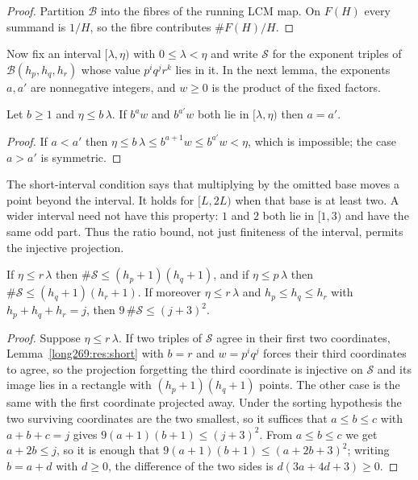 \documentclass[11pt]{article}
\theoremstyle{remark}
\theoremstyle{plain}
\newcommand{\lo}{\lambda}
\newcommand{\hi}{\eta}
\begin{document}
\begin{proof}
Partition $\mathcal B$ into the fibres of the running LCM map.  On $F(H)$ every
summand is $1/H$, so the fibre contributes $\#F(H)/H$.
\end{proof}


Now fix an interval $[\lo,\hi)$ with $0\le\lo<\hi$ and write
$\mathcal S$ for the exponent triples of $\mathcal B(h_p,h_q,h_r)$ whose
value $p^iq^jr^k$ lies in it.  In the next lemma, the exponents $a,a'$ are
nonnegative integers, and $w\ge0$ is the product of the fixed factors.

\begin{lemma}\label{long269:res:short}
Let $b\ge1$ and $\hi\le b\,\lo$.  If $b^{a}w$ and $b^{a'}w$ both lie in
$[\lo,\hi)$ then $a=a'$.
\end{lemma}

\begin{proof}
If $a<a'$ then $\hi\le b\,\lo\le b^{a+1}w\le b^{a'}w<\hi$, which is impossible;
the case $a>a'$ is symmetric.
\end{proof}

The short-interval condition says that multiplying by the omitted base
moves a point beyond the interval.  It holds for $[L,2L)$ when that base
is at least two.  A wider interval need not have this property: $1$ and
$2$ both lie in $[1,3)$ and have the same odd part.  Thus the ratio bound,
not just finiteness of the interval, permits the injective projection.

\begin{proposition}\label{long269:res:drop}
\label{long269:res:shell}
If $\hi\le r\,\lo$ then $\#\mathcal S\le(h_p+1)(h_q+1)$, and if
$\hi\le p\,\lo$ then $\#\mathcal S\le(h_q+1)(h_r+1)$.  If moreover
$\hi\le r\,\lo$ and $h_p\le h_q\le h_r$ with $h_p+h_q+h_r=j$, then
$9\,\#\mathcal S\le(j+3)^{2}$.
\end{proposition}

\begin{proof}
Suppose $\hi\le r\,\lo$.  If two triples of $\mathcal S$ agree in their first
two coordinates, Lemma~\ref{long269:res:short} with $b=r$ and $w=p^{i}q^{j}$ forces
their third coordinates to agree, so the projection forgetting the third
coordinate is injective on $\mathcal S$ and its image lies in a rectangle with
$(h_p+1)(h_q+1)$ points.  The other case is the same with the first coordinate
projected away.  Under the sorting hypothesis the two surviving coordinates are
the two smallest, so it suffices that $a\le b\le c$ with $a+b+c=j$ gives
$9(a+1)(b+1)\le(j+3)^{2}$.  From $a\le b\le c$ we get $a+2b\le j$, so it is
enough that $9(a+1)(b+1)\le(a+2b+3)^{2}$; writing $b=a+d$ with $d\ge0$, the
difference of the two sides is $d(3a+4d+3)\ge0$.
\end{proof}
\end{document}
